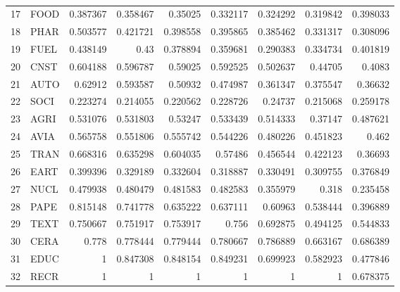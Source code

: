 \documentclass[12pt,letterpaper]{article}
\begin{document}
\begin{table}[H]
{\begin{tabular}{rlrrrrrrr}
17 & FOOD & 0.387367 & 0.358467 & 0.35025  & 0.332117 & 0.324292 & 0.319842 & 0.398033 \\
18 & PHAR & 0.503577 & 0.421721 & 0.398558 & 0.395865 & 0.385462 & 0.331317 & 0.308096 \\
19 & FUEL & 0.438149 & 0.43     & 0.378894 & 0.359681 & 0.290383 & 0.334734 & 0.401819 \\
20 & CNST & 0.604188 & 0.596787 & 0.59025  & 0.592525 & 0.502637 & 0.44705  & 0.4083   \\
21 & AUTO & 0.62912  & 0.593587 & 0.50932  & 0.474987 & 0.361347 & 0.375547 & 0.36632  \\
22 & SOCI & 0.223274 & 0.214055 & 0.220562 & 0.228726 & 0.24737  & 0.215068 & 0.259178 \\
23 & AGRI & 0.531076 & 0.531803 & 0.53247  & 0.533439 & 0.514333 & 0.37147  & 0.487621 \\
24 & AVIA & 0.565758 & 0.551806 & 0.555742 & 0.544226 & 0.480226 & 0.451823 & 0.462    \\
25 & TRAN & 0.668316 & 0.635298 & 0.604035 & 0.57486  & 0.456544 & 0.422123 & 0.36693  \\
26 & EART & 0.399396 & 0.329189 & 0.332604 & 0.318887 & 0.330491 & 0.309755 & 0.376849 \\
27 & NUCL & 0.479938 & 0.480479 & 0.481583 & 0.482583 & 0.355979 & 0.318    & 0.235458 \\
28 & PAPE & 0.815148 & 0.741778 & 0.635222 & 0.637111 & 0.60963  & 0.538444 & 0.396889 \\
29 & TEXT & 0.750667 & 0.751917 & 0.753917 & 0.756    & 0.692875 & 0.494125 & 0.544833 \\
30 & CERA & 0.778    & 0.778444 & 0.779444 & 0.780667 & 0.786889 & 0.663167 & 0.686389 \\
31 & EDUC & 1        & 0.847308 & 0.848154 & 0.849231 & 0.699923 & 0.582923 & 0.477846 \\
32 & RECR & 1        & 1        & 1        & 1        & 1        & 1        & 0.678375 \\ \hline
\end{tabular}
}
\caption{}
\label{tab:7}
\end{table}
\end{document}
